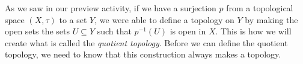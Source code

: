 \begin{comment}

\ActivitySolution

\be
\item The only possibilities for sets $U$ are those with $p^{-1}(U)$ being $\emptyset$, $\{1,2\}$, $\{4,6\}$, $\{1,2,4,6\}$, and $X$. Since $p$ is a surjection, the only time $p^{-1}(U) = \emptyset$ is when $U = \emptyset$. Also, $p^{-1}(U) = X$ when $X = Y$. We consider the remaining cases in turn. 

\begin{itemize}
\item Since $p(1) = p(6) = b$ and $p(2) = a$, $p^{-1}(U)$ can never be  $\{1,2\}$.
\item Since $p(4) = d$, and $p(2) = p(6) = a$, $p^{-1}(U)$ can never be $\{4,6\}$. 
\item Since $p(1) = b$, $p(2) = p(6) = a$, and $p(4) = d$, $p^{-1}(U) = \{1,2,4,6\}$ when $U = \{a,b,d\}$. 
\end{itemize}
Thus, 
\[\sigma = \{\emptyset, \{a,b,d\}, Y\}.\]

\item By inspection we can see that unions and intersections of sets in $\sigma$ remain in $\sigma$, so $\sigma$ is a topology on $Y$.  

\item By definition, if $U$ is in $\sigma$, then $p^{-1}(U)$ is in $\tau$. So the inverse image of any open set is open under $p$ and $p$ is continuous.

\item Suppose $\sigma'$ is a topology on $Y$ with $\sigma \subset \sigma'$. Then there exists $O \in \sigma' \setminus \sigma$. If $p^{-1}(O)$ were open, then we would have $O \in \sigma$ be definition. But this is a contradiction. So $p^{-1}(O)$ is not open and $p$ is not continuous from $(X \tau)$ to $(Y, \sigma')$. 

\ea

\end{comment}


As we saw in our preview activity, if we have a surjection $p$ from a topological space $(X,\tau)$ to a set $Y$, we were able to define a topology on $Y$ by making the open sets the sets $U \subseteq Y$ such that $p^{-1}(U)$ is open in $X$. This is how we will create what is called the \emph{quotient topology}.  Before we can define the quotient topology, we need to know that this construction always makes a topology.

